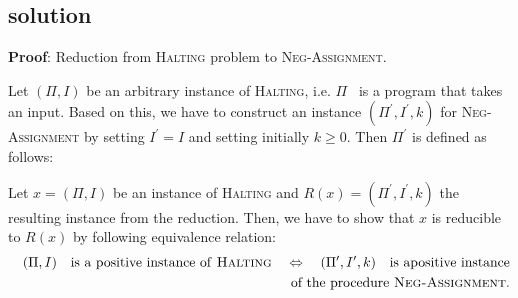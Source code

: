 \subsection{solution}
\textbf{Proof}: Reduction from \textsc{Halting} problem to \textsc{%
Neg-Assignment}.

Let $(\Pi ,I)$ be an arbitrary instance of \textsc{Halting}, i.e. $\Pi $ \
is a program that takes an input. Based on this, we have to construct an
instance $(\Pi ^{\prime },I^{\prime },k)$ for \textsc{Neg-Assignment} by
setting $I^{\prime }=I$ and setting initially $k\geq 0$. Then $\Pi ^{\prime
} $ is defined as follows:

%
%
\begin{center}
\end{center}%

Let $x=(\Pi ,I)$ be an instance of \textsc{Halting} and $R(x)=(\Pi ^{\prime
},I^{\prime },k)$ the resulting instance from the reduction. Then, we have
to show that $x$ is reducible to $R(x)$ by following equivalence relation:%
\begin{eqnarray*}
&&(\Pi ,I)\text{ is a positive instance of \textsc{Halting}}%
\quad\Leftrightarrow\quad (\Pi ^{\prime },I^{\prime },k)\text{ is apositive
instance} \\
&&\text{of the procedure \textsc{Neg-Assignment}.}
\end{eqnarray*}


